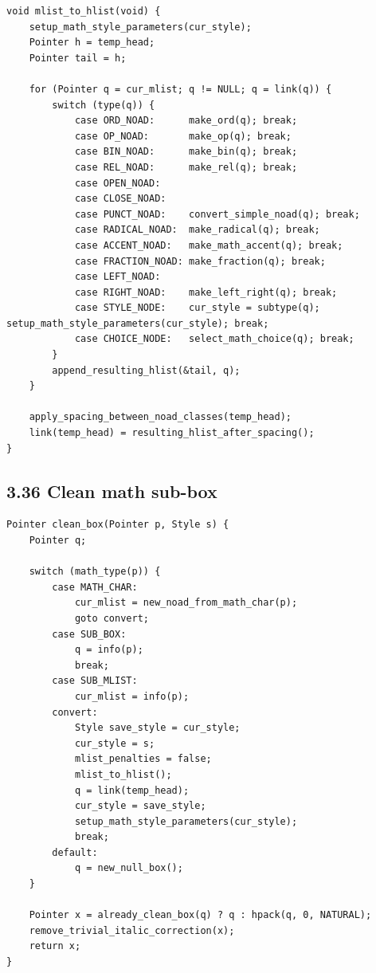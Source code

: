 \documentclass[11pt]{article}
\begin{document}
\begin{verbatim}
void mlist_to_hlist(void) {
    setup_math_style_parameters(cur_style);
    Pointer h = temp_head;
    Pointer tail = h;

    for (Pointer q = cur_mlist; q != NULL; q = link(q)) {
        switch (type(q)) {
            case ORD_NOAD:      make_ord(q); break;
            case OP_NOAD:       make_op(q); break;
            case BIN_NOAD:      make_bin(q); break;
            case REL_NOAD:      make_rel(q); break;
            case OPEN_NOAD:
            case CLOSE_NOAD:
            case PUNCT_NOAD:    convert_simple_noad(q); break;
            case RADICAL_NOAD:  make_radical(q); break;
            case ACCENT_NOAD:   make_math_accent(q); break;
            case FRACTION_NOAD: make_fraction(q); break;
            case LEFT_NOAD:
            case RIGHT_NOAD:    make_left_right(q); break;
            case STYLE_NODE:    cur_style = subtype(q); setup_math_style_parameters(cur_style); break;
            case CHOICE_NODE:   select_math_choice(q); break;
        }
        append_resulting_hlist(&tail, q);
    }

    apply_spacing_between_noad_classes(temp_head);
    link(temp_head) = resulting_hlist_after_spacing();
}
\end{verbatim}

\subsection{3.36 Clean math sub-box}\label{clean-math-sub-box}

\begin{verbatim}
Pointer clean_box(Pointer p, Style s) {
    Pointer q;

    switch (math_type(p)) {
        case MATH_CHAR:
            cur_mlist = new_noad_from_math_char(p);
            goto convert;
        case SUB_BOX:
            q = info(p);
            break;
        case SUB_MLIST:
            cur_mlist = info(p);
        convert:
            Style save_style = cur_style;
            cur_style = s;
            mlist_penalties = false;
            mlist_to_hlist();
            q = link(temp_head);
            cur_style = save_style;
            setup_math_style_parameters(cur_style);
            break;
        default:
            q = new_null_box();
    }

    Pointer x = already_clean_box(q) ? q : hpack(q, 0, NATURAL);
    remove_trivial_italic_correction(x);
    return x;
}
\end{verbatim}
\end{document}
